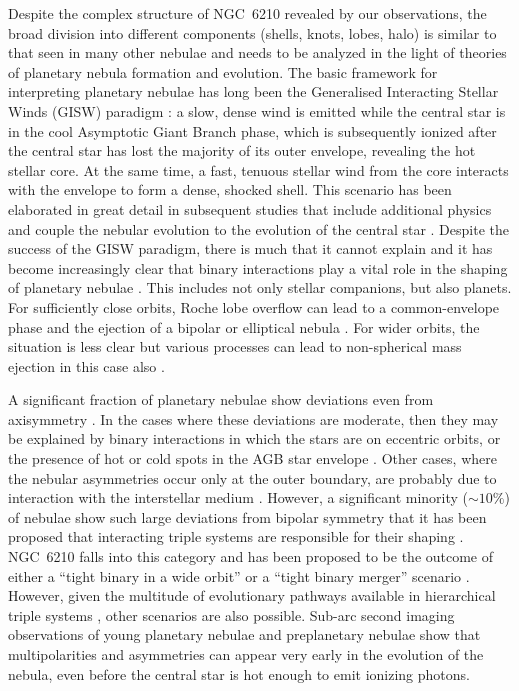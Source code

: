 \documentclass[useAMS, usenatbib]{mnras}
\begin{document}
Despite the complex structure of NGC~6210 revealed by our observations,
the broad division into different components (shells, knots, lobes, halo)
is similar to that seen in many other nebulae
\citep{Balick:1987b}
and needs to be analyzed in the light of theories of planetary nebula formation and evolution.
The basic framework for interpreting planetary nebulae has long been the
Generalised Interacting Stellar Winds (GISW) paradigm \citep{Kwok:1978a, Kahn:1985a}:
a slow, dense wind is emitted while the central star is in the cool
Asymptotic Giant Branch phase, which is subsequently ionized after the central star has lost the majority of its outer envelope,
revealing the hot stellar core.
At the same time, a fast, tenuous stellar wind from the core interacts with the envelope to form a dense, shocked shell.
This scenario has been elaborated in great detail in subsequent studies that include additional physics and couple the nebular evolution to the evolution of the central star \citep[for example,][]{Frank:1994b, Garcia-Segura:1997a, Villaver:2002a, Perinotto:2004a, Garcia-Segura:2006a, Steffen:2013a, Toala:2014a}.
Despite the success of the GISW paradigm,
there is much that it cannot explain \citep{Soker:1997a}
and it has become increasingly clear that binary interactions play a vital role in the shaping of planetary nebulae
\citetext{\citealp{Boffin:2019a} and references therein}.
This includes not only stellar companions, but also planets.
For sufficiently close orbits, Roche lobe overflow can lead to a common-envelope phase and the ejection of a bipolar or elliptical nebula \citep{Garcia-Segura:2018a}.
For wider orbits, the situation is less clear but various processes can lead to non-spherical mass ejection in this case also \citep{Kim:2012c, Chen:2017b, Chen:2020a}.

A significant fraction of planetary nebulae show deviations even from axisymmetry \citep{Soker:2001a}.
In the cases where these deviations are moderate,
then they may be explained by binary interactions in which the stars are on eccentric orbits,
or the presence of hot or cold spots in the AGB star envelope \citep{Soker:2002b}.
Other cases, where the nebular asymmetries occur only at the outer boundary,
are probably due to interaction with the interstellar medium \citep{Ali:2012a}.
However, a significant minority (\(\sim 10\%\)) of nebulae show such large deviations from bipolar symmetry \citep{Bear:2017a}
that it has been proposed that interacting triple systems are responsible for their shaping \citep{Soker:2004b, Glanz:2020a}.
NGC~6210 falls into this category and has been proposed to be the outcome of either a ``tight binary in a wide orbit'' or a ``tight binary merger'' scenario \citep{Soker:2016b}.
However, given the multitude of evolutionary pathways available in hierarchical triple systems \citep{Toonen:2016a, Toonen:2020a},
other scenarios are also possible.
Sub-arc second imaging observations of young planetary nebulae \citep{Sahai:1998a, Sahai:2011a, Hsia:2014a}
and preplanetary nebulae \citep{Sahai:2007a}
show that multipolarities and asymmetries can appear very early in the evolution of the nebula,
even before the central star is hot enough to emit ionizing photons.
\end{document}
